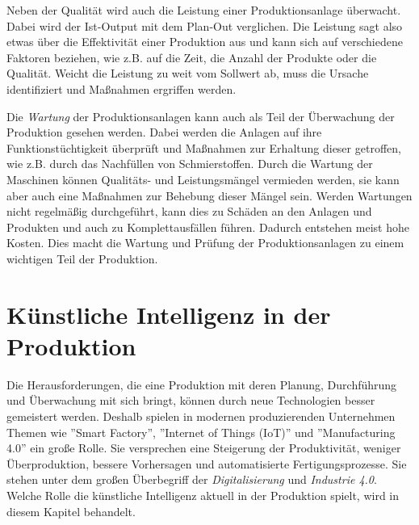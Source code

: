 \documentclass[a4paper,12pt, german]{report}
\begin{document}
Neben der Qualität wird auch die Leistung einer Produktionsanlage überwacht. Dabei wird der Ist-Output mit dem Plan-Out verglichen. Die Leistung sagt also etwas über die Effektivität einer Produktion aus und kann sich auf verschiedene Faktoren beziehen, wie z.B. auf die Zeit, die Anzahl der Produkte oder die Qualität. Weicht die Leistung zu weit vom Sollwert ab, muss die Ursache identifiziert und Maßnahmen ergriffen werden.\cite{07}

Die \textit{Wartung} der Produktionsanlagen kann auch als Teil der Überwachung der Produktion gesehen werden. Dabei werden die Anlagen auf ihre Funktionstüchtigkeit überprüft und Maßnahmen zur Erhaltung dieser getroffen, wie z.B. durch das Nachfüllen von Schmierstoffen. Durch die Wartung der Maschinen können Qualitäts- und Leistungsmängel vermieden werden, sie kann aber auch eine Maßnahmen zur Behebung dieser Mängel sein. Werden Wartungen nicht regelmäßig durchgeführt, kann dies zu Schäden an den Anlagen und Produkten und auch zu Komplettausfällen führen. Dadurch entstehen meist hohe Kosten. Dies macht die Wartung und Prüfung der Produktionsanlagen zu einem wichtigen Teil der Produktion.\cite{07}





\chapter{Künstliche Intelligenz in der Produktion}
Die Herausforderungen, die eine Produktion mit deren Planung, Durchführung und Überwachung mit sich bringt, können durch neue Technologien besser gemeistert werden. Deshalb spielen in modernen produzierenden Unternehmen Themen wie ''Smart Factory'', ''Internet of Things (IoT)'' und ''Manufacturing 4.0'' ein große Rolle. Sie versprechen eine Steigerung der Produktivität, weniger Überproduktion, bessere Vorhersagen und automatisierte Fertigungsprozesse. Sie stehen unter dem großen Überbegriff der \textit{Digitalisierung} und \textit{Industrie 4.0}. Welche Rolle die künstliche Intelligenz aktuell in der Produktion spielt, wird in diesem Kapitel behandelt.
\end{document}
